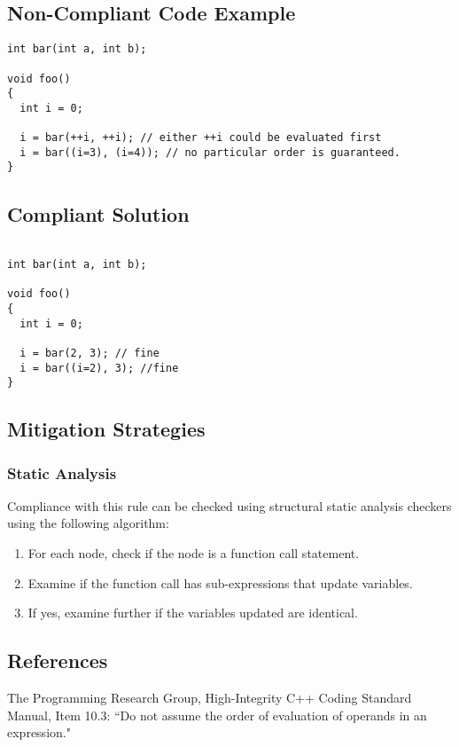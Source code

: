 \subsection{Non-Compliant Code Example}

\begin{verbatim}
int bar(int a, int b);

void foo()
{
  int i = 0;

  i = bar(++i, ++i); // either ++i could be evaluated first
  i = bar((i=3), (i=4)); // no particular order is guaranteed.
}
\end{verbatim}

\subsection{Compliant Solution}

\begin{verbatim}

int bar(int a, int b);

void foo()
{
  int i = 0;

  i = bar(2, 3); // fine
  i = bar((i=2), 3); //fine
}
\end{verbatim}

\subsection{Mitigation Strategies}
\subsubsection{Static Analysis} 

Compliance with this rule can be checked using structural static analysis checkers using the following algorithm:

\begin{enumerate}
\item For each node, check if the node is a function call statement.
\item Examine if the function call has sub-expressions that update variables.
\item If yes, examine further if the variables updated are identical.
\end{enumerate}

\subsection{References}

The Programming Research Group, High-Integrity C++ Coding Standard Manual, Item 10.3: ``Do not assume the order of evaluation of operands in an expression."
